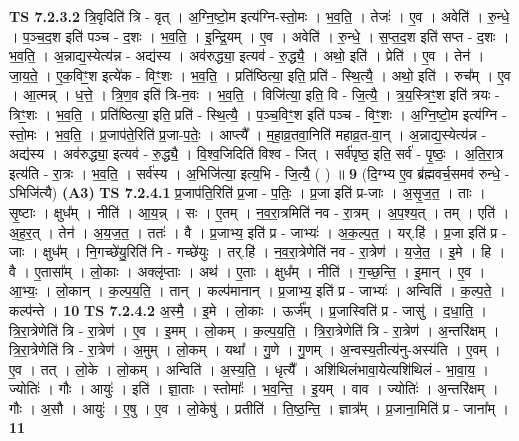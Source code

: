 \documentclass[17pt]{extarticle}
\begin{document}
                  \newline
                                \textbf{ TS 7.2.3.2} \newline
                  त्रि॒वृदिति॑ त्रि - वृत् । अ॒ग्नि॒ष्टो॒म इत्य॑ग्नि-स्तो॒मः । भ॒व॒ति॒ । तेजः॑ । ए॒व । अवेति॑ । रु॒न्धे॒ । प॒ञ्च॒द॒श इति॑ पञ्च - द॒शः । भ॒व॒ति॒ । इ॒न्द्रि॒यम् । ए॒व । अवेति॑ । रु॒न्धे॒ । स॒प्त॒द॒श इति॑ सप्त - द॒शः । भ॒व॒ति॒ । अ॒न्नाद्य॒स्येत्य॑न्न - अद्य॑स्य । अव॑रुद्ध्या॒ इत्यव॑ - रु॒द्ध्यै॒ । अथो॒ इति॑ । प्रेति॑ । ए॒व । तेन॑ । जा॒य॒ते॒ । ए॒क॒विꣳ॒॒श इत्ये॑क - विꣳ॒॒शः । भ॒व॒ति॒ । प्रति॑ष्ठित्या॒ इति॒ प्रति॑ - स्थि॒त्यै॒ । अथो॒ इति॑ । रुच᳚म् । ए॒व । आ॒त्मन्न् । ध॒त्ते॒ । त्रि॒ण॒व इति॑ त्रि-न॒वः । भ॒व॒ति॒ । विजि॑त्या॒ इति॒ वि - जि॒त्यै॒ । त्र॒य॒स्त्रिꣳ॒॒श इति॑ त्रयः - त्रिꣳ॒॒शः । भ॒व॒ति॒ । प्रति॑ष्ठित्या॒ इति॒ प्रति॑ - स्थि॒त्यै॒ । प॒ञ्च॒विꣳ॒॒श इति॑ पञ्च - विꣳ॒॒शः । अ॒ग्नि॒ष्टो॒म इत्य॑ग्नि - स्तो॒मः । भ॒व॒ति॒ । प्र॒जाप॑ते॒रिति॑ प्र॒जा-प॒तेः॒ । आप्त्यै᳚ । म॒हा॒व्र॒तवा॒निति॑ महाव्र॒त-वा॒न् । अ॒न्नाद्य॒स्येत्य॑न्न - अद्य॑स्य । अव॑रुद्ध्या॒ इत्यव॑ - रु॒द्ध्यै॒ । वि॒श्व॒जिदिति॑ विश्व - जित् । सर्व॑पृष्ठ॒ इति॒ सर्व॑ - पृ॒ष्ठः॒ । अ॒ति॒रा॒त्र इत्य॑ति - रा॒त्रः । भ॒व॒ति॒ । सर्व॑स्य । अ॒भिजि॑त्या॒ इत्य॒भि - जि॒त्यै॒ ( ) ॥ \textbf{  9} \newline
                  \newline
                      (दि॒ग्भ्य ए॒व ब्र॑ह्मवर्च॒समव॑ रुन्धे॒ - ऽभिजि॑त्यै)  \textbf{(A3)} \newline \newline
                                \textbf{ TS 7.2.4.1} \newline
                  प्र॒जाप॑ति॒रिति॑ प्र॒जा - प॒तिः॒ । प्र॒जा इति॑ प्र-जाः । अ॒सृ॒ज॒त॒ । ताः । सृ॒ष्टाः । क्षुध᳚म् । नीति॑ । आ॒य॒न्न् । सः । ए॒तम् । न॒व॒रा॒त्रमिति॑ नव - रा॒त्रम् । अ॒प॒श्य॒त् । तम् । एति॑ । अ॒ह॒र॒त् । तेन॑ । अ॒य॒ज॒त॒ । ततः॑ । वै । प्र॒जाभ्य॒ इति॑ प्र - जाभ्यः॑ । अ॒क॒ल्प॒त॒ । यर्.हि॑ । प्र॒जा इति॑ प्र - जाः । क्षुध᳚म् । नि॒गच्छे॑यु॒रिति॑ नि - गच्छे॑युः । तर्.हि॑ । न॒व॒रा॒त्रेणेति॑ नव - रा॒त्रेण॑ । य॒जे॒त॒ । इ॒मे । हि । वै । ए॒तासा᳚म् । लो॒काः । अक्लृ॑प्ताः । अथ॑ । ए॒ताः । क्षुध᳚म् । नीति॑ । ग॒च्छ॒न्ति॒ । इ॒मान् । ए॒व । आ॒भ्यः॒ । लो॒कान् । क॒ल्प॒य॒ति॒ । तान् । कल्प॑मानान् । प्र॒जाभ्य॒ इति॑ प्र - जाभ्यः॑ । अन्विति॑ । क॒ल्प॒ते॒ । कल्प॑न्ते । \textbf{  10} \newline
                  \newline
                                \textbf{ TS 7.2.4.2} \newline
                  अ॒स्मै॒ । इ॒मे । लो॒काः । ऊर्ज᳚म् । प्र॒जास्विति॑ प्र - जासु॑ । द॒धा॒ति॒ । त्रि॒रा॒त्रेणेति॑ त्रि - रा॒त्रेण॑ । ए॒व । इ॒मम् । लो॒कम् । क॒ल्प॒य॒ति॒ । त्रि॒रा॒त्रेणेति॑ त्रि - रा॒त्रेण॑ । अ॒न्तरि॑क्षम् । त्रि॒रा॒त्रेणेति॑ त्रि - रा॒त्रेण॑ । अ॒मुम् । लो॒कम् । यथा᳚ । गु॒णे । गु॒णम् । अ॒न्वस्य॒तीत्य॑नु-अस्य॑ति । ए॒वम् । ए॒व । तत् । लो॒के । लो॒कम् । अन्विति॑ । अ॒स्य॒ति॒ । धृत्यै᳚ । अशि॑थिलंभावा॒येत्यशि॑थिलं - भा॒वा॒य॒ । ज्योतिः॑ । गौः । आयुः॑ । इति॑ । ज्ञा॒ताः । स्तोमाः᳚ । भ॒व॒न्ति॒ । इ॒यम् । वाव । ज्योतिः॑ । अ॒न्तरि॑क्षम् । गौः । अ॒सौ । आयुः॑ । ए॒षु । ए॒व । लो॒केषु॑ । प्रतीति॑ । ति॒ष्ठ॒न्ति॒ । ज्ञात्र᳚म् । प्र॒जाना॒मिति॑ प्र - जाना᳚म् । \textbf{  11} \newline
\end{document}
